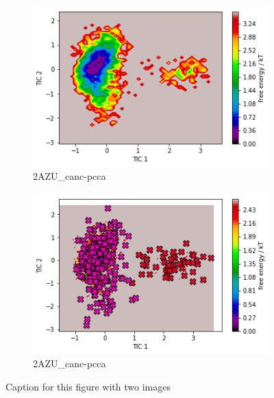 \documentclass[fleqn,10pt]{wlscirep}
\begin{document}
\begin{figure}[!ht]
\centering
\begin{subfigure}{.5\textwidth}
  \centering
  \includegraphics[width=.9\linewidth]{2AZU_canc/2AZU_canc-tica.png}
  \caption{2AZU_{canc}-pcca}
  \label{fig:2AZU_canc-tica}
\end{subfigure}%
\begin{subfigure}{.5\textwidth}
  \centering
  \includegraphics[width=.9\linewidth]{2AZU_canc/2AZU_canc-pcca.png}
  \caption{2AZU_{canc}-pcca}
  \label{fig:2AZU_canc-pcca}
\end{subfigure}
\caption{Caption for this figure with two images}
\label{fig:2AZU_canc-cluster}
\end{figure}
\end{document}

